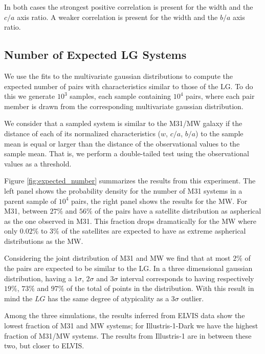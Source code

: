\documentclass[a4paper,fleqn,usenatbib]{mnras}
\begin{document}
In both cases the strongest positive correlation is present for the
width and the $c/a$ axis ratio. A weaker correlation is present for
the width and the $b/a$ axis ratio. 



\subsection{Number of Expected LG Systems}

We use the fits to the multivariate gaussian distributions to
compute the expected number of pairs with characteristics similar to
those of the LG.
To do this we generate $10^3$ samples, each sample containing $10^4$
pairs, where each pair member is drawn from the corresponding
multivariate gaussian distribution.  

We consider that a sampled system is similar to the M31/MW galaxy if the
distance of each of its normalized characteristics ($w$, $c/a$, $b/a$) to the
sample mean is equal or larger than the distance of the observational
values to the sample mean.   
That is, we perform a double-tailed test using the observational
values as a threshold. 

Figure \ref{fig:expected_number} summarizes the results from this
experiment. The left panel shows the probability density for the number of M31
systems in a parent sample of $10^4$ pairs, the right panel shows the
results for the MW.
For M31, between $27\%$ and $56\%$ of the pairs have a satellite
distribution as aspherical as the one observed in M31. This fraction drops
dramatically for the MW where only $0.02\%$ to $3\%$ of the satellites
are expected to have as extreme aspherical distributions as the MW.

Considering the joint distribution of M31 and MW we find that at most
$2\%$ of the pairs are expected to be similar to the LG.
In a three dimensional gaussian distribution, having a $1\sigma$,
$2\sigma$ and $3\sigma$ interval corresponds to having respectively $19 \%$, $73 \%$ and
$97 \%$ of the total of points in the distribution.
With this result in mind the $LG$ has the same degree of atypicality
as a $3\sigma$ outlier. 

Among the three simulations, the results inferred from ELVIS data show
the lowest fraction of M31 and MW systems; for Illustris-1-Dark we have
the highest fraction of M31/MW systems. The results from Illustris-1
are in between these two, but closer to ELVIS.
\end{document}
